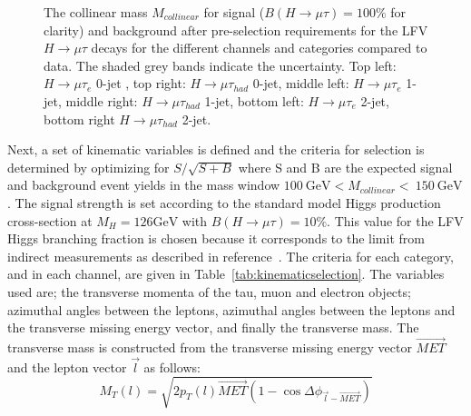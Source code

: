 \documentclass[oneside, letterpaper, oldfontcommands]{memoir}
\begin{document}
{{{\begin{figure}[hbtp]\begin{center}
 \caption{The collinear mass $M_{collinear}$ for signal ($B(H \rightarrow \mu \tau )=100\%$ for clarity) and background after pre-selection requirements for the LFV $H \rightarrow \mu \tau$  decays for the different channels and categories compared to data. The shaded grey bands indicate the uncertainty.  Top left: $H \rightarrow \mu \tau_{e}$ 0-jet , top right: $H \rightarrow \mu \tau_{had}$ 0-jet,  middle left: $H \rightarrow \mu \tau_{e}$ 1-jet, middle right: $H \rightarrow \mu \tau_{had}$
1-jet, bottom left: $H \rightarrow \mu \tau_{e}$ 2-jet, bottom right $H \rightarrow \mu \tau_{had}$ 2-jet. }
 \label{fig:Mcol_after_presel_WITHDATA}\end{center}\end{figure}




Next, a set of kinematic variables is defined and the  criteria for  selection is determined by optimizing for $S/\sqrt{S+B}$ where S and B are the expected signal and background event yields in the mass window $100\:\mathrm{GeV}< M_{collinear} < \: 150\:\mathrm{GeV}$ .
The signal strength is set according to the standard model Higgs production  cross-section at $M_{H}=126 \mathrm{GeV}$ with
$B(H \rightarrow \mu \tau )=10\%$. This value for the
LFV Higgs branching fraction is chosen because it corresponds to the limit from indirect measurements as described
in reference~\cite{Harnik:2012pb}. The criteria for each category, and in each channel, are given in Table~\ref{tab:kinematicselection}.
The variables used are; the transverse momenta of the tau, muon and electron objects;
azimuthal angles between the leptons, azimuthal angles between the leptons and the transverse missing energy vector, and finally
the transverse mass. The transverse mass is constructed from the transverse missing energy vector $\vec{MET}$
and the lepton vector $\vec{l}$ as follows:
\begin{equation*}
M_{T}(l)=\sqrt{2p_{T}(l)\vec{MET}(1-\cos{\Delta \phi_{\vec{l}-\vec{MET}}})}
\end{equation*}

}}}
\end{document}
